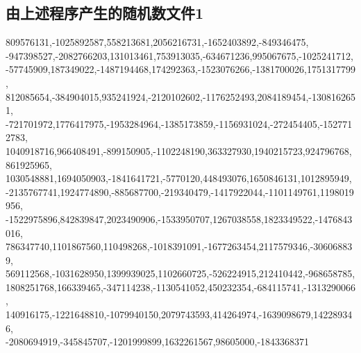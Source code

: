 \documentclass[a4paper,11pt]{article}
\begin{document}
\begin{appendices}
\section{由上述程序产生的随机数文件1}
\label{971}
809576131,-1025892587,558213681,2056216731,-1652403892,-849346475,\\
-947398527,-2082766203,131013461,753913035,-634671236,995067675,-1025241712,\\
-57745909,187349022,-1487194468,174292363,-1523076266,-1381700026,1751317799,\\
812085654,-384904015,935241924,-2120102602,-1176252493,2084189454,-1308162651,\\
-721701972,1776417975,-1953284964,-1385173859,-1156931024,-272454405,-1527712783,\\
1040918716,966408491,-899150905,-1102248190,363327930,1940215723,924796768,861925965,\\
1030548881,1694050903,-1841641721,-5770120,448493076,1650846131,1012895949,\\
-2135767741,1924774890,-885687700,-219340479,-1417922044,-1101149761,1198019956,\\
-1522975896,842839847,2023490906,-1533950707,1267038558,1823349522,-1476843016,\\
786347740,1101867560,110498268,-1018391091,-1677263454,2117579346,-306068839,\\
569112568,-1031628950,1399939025,1102660725,-526224915,212410442,-968658785,\\
1808251768,166339465,-347114238,-1130541052,450232354,-684115741,-1313290066,\\
140916175,-1221648810,-1079940150,2079743593,414264974,-1639098679,142289346,\\
-2080694919,-345845707,-1201999899,1632261567,98605000,-1843368371



\end{appendices}
\end{document}
